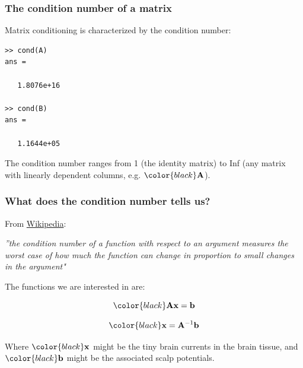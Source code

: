 \documentclass[compress]{beamer}
\newcommand{\black}[1]{{\color{black}#1}}
\newcommand{\beq}[1]{\[\black{#1}\]}
\begin{document}
\begin{frame}[fragile]
\frametitle{The condition number of a matrix}

Matrix conditioning is characterized by the condition number:

\color{black}
\begin{verbatim}
>> cond(A)
ans =

   1.8076e+16
   
>> cond(B)
ans =

   1.1644e+05
\end{verbatim}

\color{gray}

The condition number ranges from \black{1} (the identity matrix) to \black{Inf} (any matrix with linearly dependent columns, e.g. $\black{\A}$).
\end{frame}


\begin{frame}[fragile]
\frametitle{What does the condition number tells us?}

From \black{\href{http://en.wikipedia.org/wiki/Condition\_number}{Wikipedia}}:

\vspace{.3cm}

\textit{\small{''the condition number of a function with respect to an argument measures the worst case of how much the function can change in proportion to small changes in the argument"}} 


\vspace{.2cm}
The functions we are interested in are:

\beq{
\A\x = \b
}

\beq{
\x = \A^{-1}\b
}

Where $\black{\x}$ might be the tiny brain currents in the brain tissue, and $\black{\b}$ might be the associated scalp potentials.

\end{frame}
\end{document}
